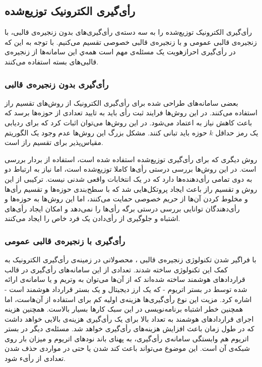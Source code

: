 \subsection{رأی‌گیری الکترونیک توزیع‌شده}
رأی‌گیری الکترونیک توزیع‌شده را به سه دسته‌ی رأی‌گیری‌های بدون زنجیره‌ی قالبی، با زنجیره‌ی قالبی عمومی و با زنجیره‌ی قالبی خصوصی تقسیم می‌کنیم. با توجه به این که در رأی‌گیری احرازهویت یک مسئله‌ی مهم است همه‌ي این سامانه‌ها از زنجیره‌ی قالبی‌های بسته استفاده می‌کنند.
\subsubsection{رأی‌گیری بدون زنجیره‌ی قالبی} 
بعضی سامانه‌های طراحی شده برای رأی‌گیری الکترونیک
\cite{secret1}
\cite{secret2}
\cite{secret3}
از روش‌های تقسیم راز
استفاده می‌کنند. در این روش‌ها فرایند ثبت رأی باید به تایید تعدادی از حوزه‌ها برسد که باعث کاهش نیاز به اعتماد می‌شود. در این روش‌ها می‌توان اثبات کرد که برای ردیابی یک رمز حداقل $k$ حوزه باید تبانی کنند. مشکل بزرگ این روش‌ها عدم وجود یک الگوریتم مقیاس‌پذیر برای تقسیم راز است.
\par
روش دیگری که برای رأی‌گیری توزیع‌شده استفاده شده است، استفاده از بردار‌ بررسی
\cite{checkvector}
است. در این روش‌ها بررسی درستی رأی‌ها کاملا توزیع‌شده‌ است، اما نیاز به ارتباط دو به دوی تمامی رأی‌دهنده‌ها دارد که در یک انتخابات واقعی شدنی نیست. ترکیبی از این روش و تقسیم راز باعث ایجاد پروتکل‌هایی
\cite{MPO1} \cite{evotinwocrypto}
شد که با سطح‌بندی حوزه‌ها و تقسیم رأی‌ها و مخلوط کردن آن‌ها از حریم خصوصی حمایت می‌کنند، اما این روش‌ها به حوزه‌ها و رأی‌دهندگان توانایی بررسی درستی برگه رأی‌ها را نمی‌دهد و امکان ایجاد رأی‌های اشتباه و جلوگیری از رأی‌دادن یک فرد خاص را ایجاد می‌کنند. 


\subsubsection{رأی‌گیری با زنجیره‌ی قالبی عمومی}
با فراگیر شدن تکنولوژی زنجیره‌ی قالبی
\cite{rosgood}
، محصولاتی در زمینه‌ی رأی‌گیری الکترونیک به کمک این تکنولوژی ساخته شدند. تعدادی از این سامانه‌های رأی‌گیری در قالب قرارداد‌های هوشمند
\cite{SmartContract}
ساخته‌ شده‌اند که از آن‌ها می‌توان به وتریم 
\cite{votereum}
و یا سامانه‌ی ارائه شده توسط
\cite{yavuz}
در بستر اتریوم
\cite{Ethereum}
- که یک ارز دیجیتال و یک بستر قرارداد هوشمند است - 
اشاره کرد. مزیت این نوع رأی‌گیری‌ها هزینه‌ی اولیه کم برای استفاده از آن‌هاست، اما همچنین خطر اشتباه برنامه‌نویسی
\cite{surveyAtt}
\cite{gyges} \cite{smart}
در این سبک کارها بسیار بالاست. همچنین هزینه اجرای قراردادهای هوشمند به تعداد بالا برای یک رأی‌گیری هزینه‌ی بالایی خواهد داشت که در طول زمان باعث افزایش هزینه‌های رأی‌گیری خواهد شد. مسئله‌ی دیگر در بستر اتریوم هم وابستگی سامانه‌ی رأی‌گیری، به پهنای باند نود‌های اتریوم و میزان بار روی شبکه‌ی آن است. این موضوع می‌تواند باعث کند شدن یا حتی در مواردی حذف شدن تعدادی از رأیء شود.

